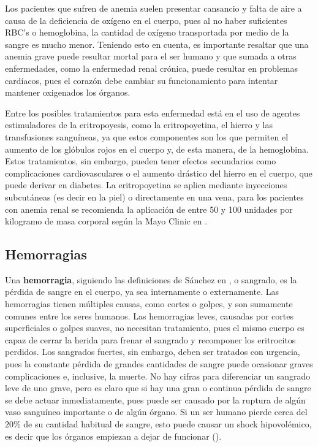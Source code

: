 Los pacientes que sufren de anemia suelen presentar cansancio y falta de aire a causa de la deficiencia de oxígeno en el cuerpo, pues al no haber suficientes RBC's o hemoglobina, la cantidad de oxígeno transportada por medio de la sangre es mucho menor. Teniendo esto en cuenta, es importante resaltar que una anemia grave puede resultar mortal para el ser humano y que sumada a otras enfermedades, como la enfermedad renal crónica, puede resultar en problemas cardíacos, pues el corazón debe cambiar su funcionamiento para intentar mantener oxigenados los órganos.

Entre los posibles tratamientos para esta enfermedad está en el uso de agentes estimuladores de la eritropoyesis, como la eritropoyetina, el hierro y las transfusiones sanguíneas, ya que estos componentes son los que permiten el aumento de los glóbulos rojos en el cuerpo y, de esta manera, de la hemoglobina. Estos tratamientos, sin embargo, pueden tener efectos secundarios como complicaciones cardiovasculares o el aumento drástico del hierro en el cuerpo, que puede derivar en diabetes. La eritropoyetina se aplica mediante inyecciones subcutáneas (es decir en la piel) o directamente en una vena, para los pacientes con anemia renal se recomienda la aplicación de entre 50 y 100 unidades por kilogramo de masa corporal según la Mayo Clinic en \cite{MayoClinic}.

\subsection{Hemorragias}\label{subsec:RBC:enfermedades:hemorragias}
Una \textbf{hemorragia}, siguiendo las definiciones de Sánchez en \cite{Sanchez2000Hemorragias}, o sangrado, es la pérdida de sangre en el cuerpo, ya sea internamente o externamente. Las hemorragias tienen múltiples causas, como cortes o golpes, y son sumamente comunes entre los seres humanos. Las hemorragias leves, causadas por cortes superficiales o golpes suaves, no necesitan tratamiento, pues el mismo cuerpo es capaz de cerrar la herida para frenar el sangrado y recomponer los eritrocitos perdidos. Los sangrados fuertes, sin embargo, deben ser tratados con urgencia, pues la constante pérdida de grandes cantidades de sangre puede ocasionar graves complicaciones e, inclusive, la muerte. No hay cifras para diferenciar un sangrado leve de uno grave, pero es claro que si hay una gran o continua pérdida de sangre se debe actuar inmediatamente, pues puede ser causado por la ruptura de algún vaso sanguíneo importante o de algún órgano. Si un ser humano pierde cerca del $20\%$ de su cantidad habitual de sangre, esto puede causar un shock hipovolémico, es decir que los órganos empiezan a dejar de funcionar (\cite{PerdidaSangre}).

